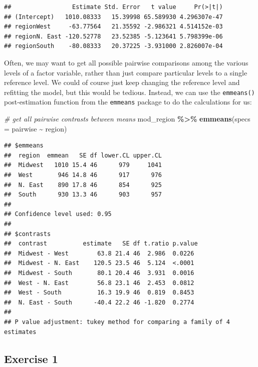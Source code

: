 \documentclass[
]{book}
\newenvironment{Shaded}{\begin{snugshade}}{\end{snugshade}}
\newcommand{\CommentTok}[1]{\textcolor[rgb]{0.56,0.35,0.01}{\textit{#1}}}
\newcommand{\DataTypeTok}[1]{\textcolor[rgb]{0.13,0.29,0.53}{#1}}
\newcommand{\KeywordTok}[1]{\textcolor[rgb]{0.13,0.29,0.53}{\textbf{#1}}}
\newcommand{\NormalTok}[1]{#1}
\newcommand{\OperatorTok}[1]{\textcolor[rgb]{0.81,0.36,0.00}{\textbf{#1}}}
\newcommand{\StringTok}[1]{\textcolor[rgb]{0.31,0.60,0.02}{#1}}
\begin{document}
\begin{verbatim}
##                 Estimate Std. Error   t value     Pr(>|t|)
## (Intercept)   1010.08333   15.39998 65.589930 4.296307e-47
## regionWest     -63.77564   21.35592 -2.986321 4.514152e-03
## regionN. East -120.52778   23.52385 -5.123641 5.798399e-06
## regionSouth    -80.08333   20.37225 -3.931000 2.826007e-04
\end{verbatim}

Often, we may want to get all possible pairwise comparisons among the various levels of a factor variable, rather than just compare particular levels to a single reference level. We could of course just keep changing the reference level and refitting the model, but this would be tedious. Instead, we can use the \texttt{emmeans()} post-estimation function from the \texttt{emmeans} package to do the calculations for us:

\begin{Shaded}
\begin{Highlighting}[]
  \CommentTok{\# get all pairwise contrasts between means}
\NormalTok{  mod\_region }\OperatorTok{\%\textgreater{}\%}
\StringTok{      }\KeywordTok{emmeans}\NormalTok{(}\DataTypeTok{specs =}\NormalTok{ pairwise }\OperatorTok{\textasciitilde{}}\StringTok{ }\NormalTok{region)}
\end{Highlighting}
\end{Shaded}

\begin{verbatim}
## $emmeans
##  region  emmean   SE df lower.CL upper.CL
##  Midwest   1010 15.4 46      979     1041
##  West       946 14.8 46      917      976
##  N. East    890 17.8 46      854      925
##  South      930 13.3 46      903      957
## 
## Confidence level used: 0.95 
## 
## $contrasts
##  contrast          estimate   SE df t.ratio p.value
##  Midwest - West        63.8 21.4 46  2.986  0.0226 
##  Midwest - N. East    120.5 23.5 46  5.124  <.0001 
##  Midwest - South       80.1 20.4 46  3.931  0.0016 
##  West - N. East        56.8 23.1 46  2.453  0.0812 
##  West - South          16.3 19.9 46  0.819  0.8453 
##  N. East - South      -40.4 22.2 46 -1.820  0.2774 
## 
## P value adjustment: tukey method for comparing a family of 4 estimates
\end{verbatim}

\hypertarget{exercise-1-1}{%
\subsection{Exercise 1}\label{exercise-1-1}}
\end{document}
